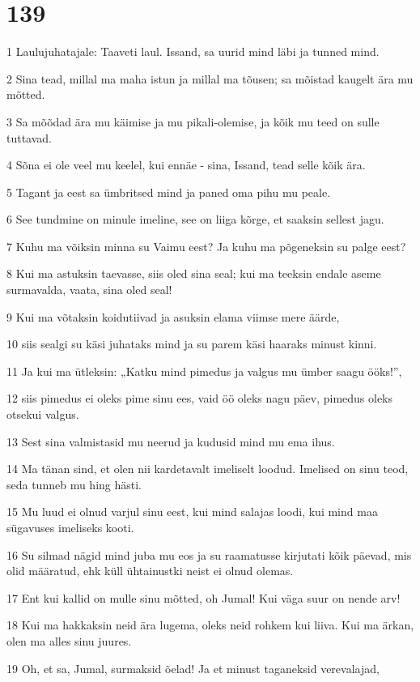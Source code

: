 \chapter{139}

\par 1 Laulujuhatajale: Taaveti laul. Issand, sa uurid mind läbi ja tunned mind.
\par 2 Sina tead, millal ma maha istun ja millal ma tõusen; sa mõistad kaugelt ära mu mõtted.
\par 3 Sa mõõdad ära mu käimise ja mu pikali-olemise, ja kõik mu teed on sulle tuttavad.
\par 4 Sõna ei ole veel mu keelel, kui ennäe - sina, Issand, tead selle kõik ära.
\par 5 Tagant ja eest sa ümbritsed mind ja paned oma pihu mu peale.
\par 6 See tundmine on minule imeline, see on liiga kõrge, et saaksin sellest jagu.
\par 7 Kuhu ma võiksin minna su Vaimu eest? Ja kuhu ma põgeneksin su palge eest?
\par 8 Kui ma astuksin taevasse, siis oled sina seal; kui ma teeksin endale aseme surmavalda, vaata, sina oled seal!
\par 9 Kui ma võtaksin koidutiivad ja asuksin elama viimse mere äärde,
\par 10 siis sealgi su käsi juhataks mind ja su parem käsi haaraks minust kinni.
\par 11 Ja kui ma ütleksin: „Katku mind pimedus ja valgus mu ümber saagu ööks!”,
\par 12 siis pimedus ei oleks pime sinu ees, vaid öö oleks nagu päev, pimedus oleks otsekui valgus.
\par 13 Sest sina valmistasid mu neerud ja kudusid mind mu ema ihus.
\par 14 Ma tänan sind, et olen nii kardetavalt imeliselt loodud. Imelised on sinu teod, seda tunneb mu hing hästi.
\par 15 Mu luud ei olnud varjul sinu eest, kui mind salajas loodi, kui mind maa sügavuses imeliseks kooti.
\par 16 Su silmad nägid mind juba mu eos ja su raamatusse kirjutati kõik päevad, mis olid määratud, ehk küll ühtainustki neist ei olnud olemas.
\par 17 Ent kui kallid on mulle sinu mõtted, oh Jumal! Kui väga suur on nende arv!
\par 18 Kui ma hakkaksin neid ära lugema, oleks neid rohkem kui liiva. Kui ma ärkan, olen ma alles sinu juures.
\par 19 Oh, et sa, Jumal, surmaksid õelad! Ja et minust taganeksid verevalajad,
